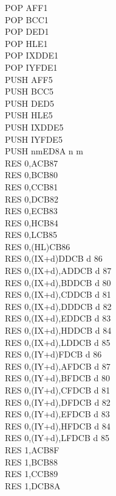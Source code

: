 \documentclass[12pt,twoside,openright,a4paper]{book}
\begin{document}
\begin{multicols}{3}
{\begin{tabbing}
		POP AF\>F1\\
		POP BC\>C1\\
		POP DE\>D1\\
		POP HL\>E1\\
		POP IX\>DDE1\\
		POP IY\>FDE1\\
		PUSH AF\>F5\\
		PUSH BC\>C5\\
		PUSH DE\>D5\\
		PUSH HL\>E5\\
		PUSH IX\>DDE5\\
		PUSH IY\>FDE5\\
		PUSH nm\ZXN\>ED8A n m\\
		RES 0,A\>CB87\\
		RES 0,B\>CB80\\
		RES 0,C\>CB81\\
		RES 0,D\>CB82\\
		RES 0,E\>CB83\\
		RES 0,H\>CB84\\
		RES 0,L\>CB85\\
		RES 0,(HL)\>CB86\\
		RES 0,(IX+d)\>DDCB d 86\\
		RES 0,(IX+d),A\UNDOC\>DDCB d 87\\
		RES 0,(IX+d),B\UNDOC\>DDCB d 80\\
		RES 0,(IX+d),C\UNDOC\>DDCB d 81\\
		RES 0,(IX+d),D\UNDOC\>DDCB d 82\\
		RES 0,(IX+d),E\UNDOC\>DDCB d 83\\
		RES 0,(IX+d),H\UNDOC\>DDCB d 84\\
		RES 0,(IX+d),L\UNDOC\>DDCB d 85\\
		RES 0,(IY+d)\>FDCB d 86\\
		RES 0,(IY+d),A\UNDOC\>FDCB d 87\\
		RES 0,(IY+d),B\UNDOC\>FDCB d 80\\
		RES 0,(IY+d),C\UNDOC\>FDCB d 81\\
		RES 0,(IY+d),D\UNDOC\>FDCB d 82\\
		RES 0,(IY+d),E\UNDOC\>FDCB d 83\\
		RES 0,(IY+d),H\UNDOC\>FDCB d 84\\
		RES 0,(IY+d),L\UNDOC\>FDCB d 85\\
		RES 1,A\>CB8F\\
		RES 1,B\>CB88\\
		RES 1,C\>CB89\\
		RES 1,D\>CB8A\\

\end{tabbing}}
\end{multicols}
\end{document}
